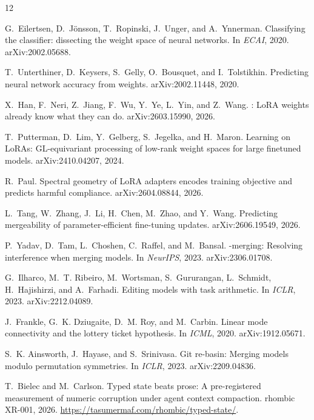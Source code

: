 \documentclass[10pt]{article}
\begin{document}
\begin{thebibliography}{12}

G.~Eilertsen, D.~J{\"o}nsson, T.~Ropinski, J.~Unger, and A.~Ynnerman.
\newblock Classifying the classifier: dissecting the weight space of neural
  networks.
\newblock In \emph{ECAI}, 2020. arXiv:2002.05688.

T.~Unterthiner, D.~Keysers, S.~Gelly, O.~Bousquet, and I.~Tolstikhin.
\newblock Predicting neural network accuracy from weights.
\newblock arXiv:2002.11448, 2020.

X.~Han, F.~Neri, Z.~Jiang, F.~Wu, Y.~Ye, L.~Yin, and Z.~Wang.
: {LoRA} weights already know what they can do.
\newblock arXiv:2603.15990, 2026.

T.~Putterman, D.~Lim, Y.~Gelberg, S.~Jegelka, and H.~Maron.
\newblock Learning on {LoRAs}: {GL}-equivariant processing of low-rank
  weight spaces for large finetuned models.
\newblock arXiv:2410.04207, 2024.

R.~Paul.
\newblock Spectral geometry of {LoRA} adapters encodes training objective
  and predicts harmful compliance.
\newblock arXiv:2604.08844, 2026.

L.~Tang, W.~Zhang, J.~Li, H.~Chen, M.~Zhao, and Y.~Wang.
\newblock Predicting mergeability of parameter-efficient fine-tuning
  updates.
\newblock arXiv:2606.19549, 2026.

P.~Yadav, D.~Tam, L.~Choshen, C.~Raffel, and M.~Bansal.
-merging: Resolving interference when merging models.
\newblock In \emph{NeurIPS}, 2023. arXiv:2306.01708.

G.~Ilharco, M.~T. Ribeiro, M.~Wortsman, S.~Gururangan, L.~Schmidt,
  H.~Hajishirzi, and A.~Farhadi.
\newblock Editing models with task arithmetic.
\newblock In \emph{ICLR}, 2023. arXiv:2212.04089.

J.~Frankle, G.~K. Dziugaite, D.~M. Roy, and M.~Carbin.
\newblock Linear mode connectivity and the lottery ticket hypothesis.
\newblock In \emph{ICML}, 2020. arXiv:1912.05671.

S.~K. Ainsworth, J.~Hayase, and S.~Srinivasa.
\newblock Git re-basin: Merging models modulo permutation symmetries.
\newblock In \emph{ICLR}, 2023. arXiv:2209.04836.

T.~Bielec and M.~Carlson.
\newblock Typed state beats prose: A pre-registered measurement of numeric
  corruption under agent context compaction.
\newblock rhombic XR-001, 2026.
  \url{https://tasumermaf.com/rhombic/typed-state/}.

\end{thebibliography}
\end{document}
